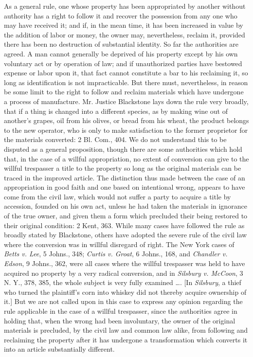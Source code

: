 As a general rule, one whose property has been appropriated by another without
authority has a right to follow it and recover the possession from any one who
may have received it; and if, in the mean time, it has been increased in value
by the addition of labor or money, the owner may, nevertheless, reclaim it,
provided there has been no destruction of substantial identity. So far the
authorities are agreed. A man cannot generally be deprived of his property
except by his own voluntary act or by operation of law; and if unauthorized
parties have bestowed expense or labor upon it, that fact cannot constitute a
bar to his reclaiming it, so long as identification is not impracticable. But
there must, nevertheless, in reason be some limit to the right to follow and
reclaim materials which have undergone a process of manufacture. Mr. Justice
Blackstone lays down the rule very broadly, that if a thing is changed into a
different species, as by making wine out of another's grapes, oil from his
olives, or bread from his wheat, the product belongs to the new operator, who
is only to make satisfaction to the former proprietor for the materials
converted: 2 Bl. Com., 404. We do not understand this to be disputed as a
general proposition, though there are some authorities which hold that, in the
case of a willful appropriation, no extent of conversion can give to the
willful trespasser a title to the property so long as the original materials
can be traced in the improved article. The distinction thus made between the
case of an appropriation in good faith and one based on intentional wrong,
appears to have come from the civil law, which would not suffer a party to
acquire a title by accession, founded on his own act, unless he had taken the
materials in ignorance of the true owner, and given them a form which precluded
their being restored to their original condition: 2 Kent, 363. While many cases
have followed the rule as broadly stated by Blackstone, others have adopted the
severe rule of the civil law where the conversion was in willful disregard of
right. The New York cases of \textit{Betts v. Lee}, 5 Johns., 348;
\textit{Curtis v. Groat}, 6 Johns., 168, and \textit{Chandler v. Edson}, 9
Johns., 362, were all cases where the willful trespasser was held to have
acquired no property by a very radical conversion, and in \textit{Silsbury v.
McCoon}, 3 N. Y., 378, 385, the whole subject is very fully examined \ldots .
[In \textit{Silsbury}, a thief who turned the plaintiff's corn into whiskey did
not thereby acquire ownership of it.] But we are not called upon in this case
to express any opinion regarding the rule applicable in the case of a willful
trespasser, since the authorities agree in holding that, when the wrong had
been involuntary, the owner of the original materials is precluded, by the
civil law and common law alike, from following and reclaiming the property
after it has undergone a transformation which converts it into an article
substantially different.

